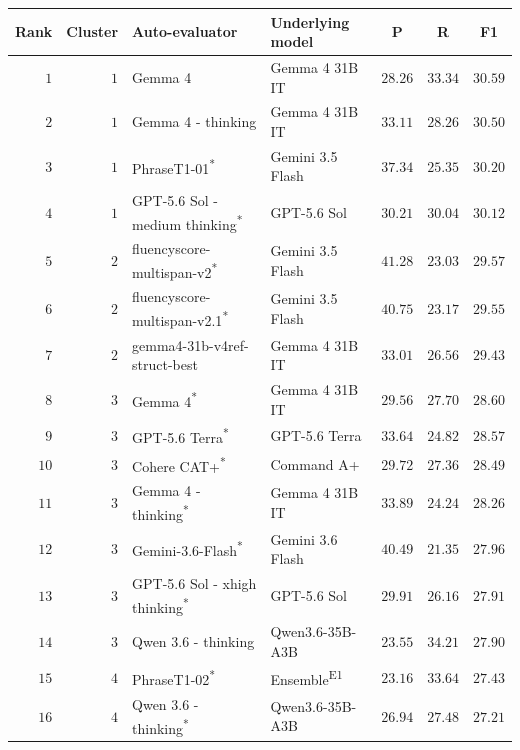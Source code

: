 \begin{table}[t]
\centering
\small
\begin{tabular}{rrllrrr}
\toprule
\multicolumn{1}{c}{Rank} & \multicolumn{1}{c}{Cluster} & Auto-evaluator & Underlying model & \multicolumn{1}{c}{P} & \multicolumn{1}{c}{R} & \multicolumn{1}{c}{F1} \\
\midrule
\rowcolor{black!15} $1$ & $1$ & Gemma 4 & Gemma 4 31B IT & $28.26$ & $33.34$ & $30.59$ \\
\rowcolor{black!15} $2$ & $1$ & Gemma 4 - thinking & Gemma 4 31B IT & $33.11$ & $28.26$ & $30.50$ \\
$3$ & $1$ & PhraseT1-01\textsuperscript{*} & Gemini 3.5 Flash & $37.34$ & $25.35$ & $30.20$ \\
\rowcolor{black!15} $4$ & $1$ & GPT-5.6 Sol - medium thinking\textsuperscript{*} & GPT-5.6 Sol & $30.21$ & $30.04$ & $30.12$ \\
$5$ & $2$ & fluencyscore-multispan-v2\textsuperscript{*} & Gemini 3.5 Flash & $41.28$ & $23.03$ & $29.57$ \\
$6$ & $2$ & fluencyscore-multispan-v2.1\textsuperscript{*} & Gemini 3.5 Flash & $40.75$ & $23.17$ & $29.55$ \\
$7$ & $2$ & gemma4-31b-v4ref-struct-best & Gemma 4 31B IT & $33.01$ & $26.56$ & $29.43$ \\
\rowcolor{black!15} $8$ & $3$ & Gemma 4\textsuperscript{*} & Gemma 4 31B IT & $29.56$ & $27.70$ & $28.60$ \\
\rowcolor{black!15} $9$ & $3$ & GPT-5.6 Terra\textsuperscript{*} & GPT-5.6 Terra & $33.64$ & $24.82$ & $28.57$ \\
$10$ & $3$ & Cohere CAT+\textsuperscript{*} & Command A+ & $29.72$ & $27.36$ & $28.49$ \\
\rowcolor{black!15} $11$ & $3$ & Gemma 4 - thinking\textsuperscript{*} & Gemma 4 31B IT & $33.89$ & $24.24$ & $28.26$ \\
\rowcolor{black!15} $12$ & $3$ & Gemini-3.6-Flash\textsuperscript{*} & Gemini 3.6 Flash & $40.49$ & $21.35$ & $27.96$ \\
\rowcolor{black!15} $13$ & $3$ & GPT-5.6 Sol - xhigh thinking\textsuperscript{*} & GPT-5.6 Sol & $29.91$ & $26.16$ & $27.91$ \\
\rowcolor{black!15} $14$ & $3$ & Qwen 3.6 - thinking & Qwen3.6-35B-A3B & $23.55$ & $34.21$ & $27.90$ \\
$15$ & $4$ & PhraseT1-02\textsuperscript{*} & Ensemble\textsuperscript{E1} & $23.16$ & $33.64$ & $27.43$ \\
\rowcolor{black!15} $16$ & $4$ & Qwen 3.6 - thinking\textsuperscript{*} & Qwen3.6-35B-A3B & $26.94$ & $27.48$ & $27.21$ \\

\end{tabular}
\end{table}
